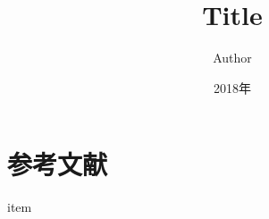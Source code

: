 \documentclass[uplatex,a4paper,11pt]{jsarticle}
\title{Title}
\author{Author}
\date{2018年}
\begin{document}
\setlength{\abovedisplayskip}{-7pt}
\setlength{\belowdisplayskip}{5pt}
\maketitle


\section{参考文献}\vspace{-3zh}
\begin{thebibliography}{99}
 item
\end{thebibliography}
\end{document}
